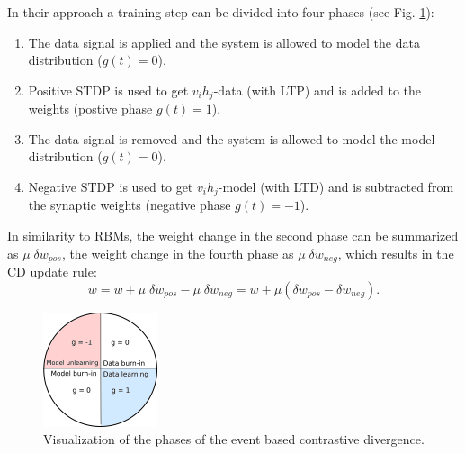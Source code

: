 In their approach a training step can be divided into four phases (see Fig. \ref{fig:ecdph}):
\begin{enumerate}
\item The data signal is applied and the system is allowed to model the data distribution ($g(t)=0$).
\item Positive STDP is used to get $v_i h_j$-data (with LTP) and is added to the weights (postive phase $g(t)=1$).
\item The data signal is removed and the system is allowed to model the model distribution ($g(t)=0$).
\item Negative STDP is used to get $v_i h_j$-model (with LTD) and is subtracted from the synaptic weights (negative phase $g(t)=-1$).
\end{enumerate}


In similarity to RBMs, the weight change in the second phase can be summarized as $\mu \; \delta w_{pos}$, the weight change in the fourth phase as $\mu \; \delta w_{neg}$, which results in the CD update rule:
\[
w = w +  \mu \; \delta w_{pos} - \mu \; \delta w_{neg} = w +  \mu (\delta w_{pos} - \delta w_{neg}).
\]
 
 

\begin{figure}[h!]
	\centering
    	\includegraphics[width=0.3\textwidth]{imgs/eCD11.png} 
    \caption{Visualization of the phases of the event based contrastive divergence.}
	\label{fig:ecdph}
\end{figure}